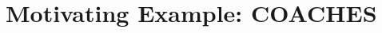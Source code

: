 \documentclass[pdftex,12pt,a4paper]{report}
\begin{document}
\section{Motivating Example: COACHES}
\label{sec:motivating}
%
%
%
%
%
%
%
\end{document}
